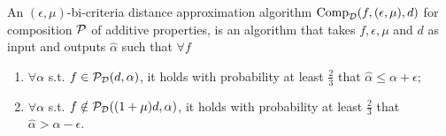 An $(\epsilon,\mu)$-bi-criteria distance approximation algorithm ${\mathrm{Comp}}_{{\mathcal{D}}}(f,(\epsilon,\mu),d)$ for composition ${\mathcal{P}}$ of additive properties, is an algorithm that takes $f,\epsilon,\mu$ and $d$ as input and outputs $\hat\alpha$ such that $\forall f$
\begin{enumerate}
\item $\forall \alpha$ s.t. $f\in{\mathcal{P}}_{{\mathcal{D}}}(d,\alpha)$, it holds with probability at least $\frac{2}{3}$ that $\hat\alpha\leq\alpha+\epsilon$;
\item $\forall \alpha$ s.t. $f\notin{\mathcal{P}}_{{\mathcal{D}}}((1+\mu)d,\alpha)$, it holds with probability at least $\frac{2}{3}$ that $\hat\alpha>\alpha-\epsilon$.
\end{enumerate}

